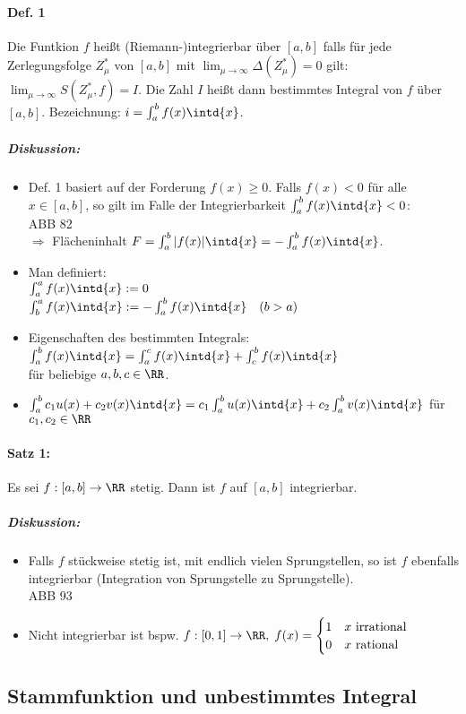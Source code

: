 \paragraph{Def. 1} Die Funtkion $f$ heißt (Riemann-)integrierbar über $[a,b]$ falls für jede Zerlegungsfolge $Z^*_\mu$ von $[a,b]$ mit $\lim_{\mu\to \infty}\Delta (Z^*_\mu)=0$ gilt: $\lim_{\mu\to\infty}S(Z^*_\mu, f) = I$. Die Zahl $I$ heißt dann bestimmtes Integral von $f$ über $[a,b]$. Bezeichnung: $i=\int_a^bf(x)\intd{x}$.
\subparagraph{Diskussion:}
\begin{itemize}
\item Def. 1 basiert auf der Forderung $f(x)\geq 0$. Falls $f(x)<0$ für alle $x\in [a,b]$, so gilt im Falle der Integrierbarkeit $\int_a^bf(x)\intd{x}<0$:\\
ABB 82\\
$\Rightarrow$ Flächeninhalt $F=\int_a^b|f(x)|\intd{x}=-\int_a^bf(x)\intd{x}$.
\item Man definiert:\\
$\int_a^af(x)\intd{x}:=0$\\
$\int_b^af(x)\intd{x}:= - \int_a^bf(x)\intd{x} \quad (b>a)$
\item Eigenschaften des bestimmten Integrals:\\
$\int_a^bf(x)\intd{x}=\int_a^cf(x)\intd{x}+\int_c^bf(x)\intd{x}$\\
für beliebige $a, b, c \in \RR$.
\item $\int_a^bc_1 u(x) + c_2 v(x) \intd{x} = c_1 \int_a^bu(x)\intd{x}+c_2 \int_a^b v(x) \intd{x}$ für $c_1, c_2 \in \RR$
\end{itemize}
\paragraph{Satz 1:} Es sei $f: [a,b] \to \RR$ stetig. Dann ist $f$ auf $[a,b]$ integrierbar. 
\subparagraph{Diskussion:} 
\begin{itemize}
\item Falls $f$ stückweise stetig ist, mit endlich vielen Sprungstellen, so ist $f$ ebenfalls integrierbar (Integration von Sprungstelle zu Sprungstelle).\\
ABB 93
\item Nicht integrierbar ist bspw. $f: [0,1] \to \RR, \; f(x) = \begin{cases}
1 & x \text{ irrational}\\
0 & x \text{ rational}
\end{cases}$
\end{itemize}
\subsection{Stammfunktion und unbestimmtes Integral}
